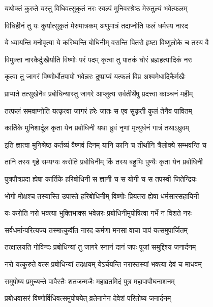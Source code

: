 \twolineshloka
{यथोक्तं कुरुते यस्तु विधिवत्सुकृतं नरः}
{स्वल्पं मुनिवरश्रेष्ठ मेरुतुल्यं भवेत्फलम्}%

\twolineshloka
{विधिहीनं तु यः कुर्यात्सुकृतं मेरुमात्रकम्}
{अणुमात्रं तदाप्नोति फलं धर्मस्य नारद}%

\twolineshloka
{ये ध्यायन्ति मनोवृत्या ये करिष्यन्ति बोधिनीम्}
{वसन्ति पितरो हृष्टा विष्णुलोके च तस्य वै}%

\twolineshloka
{विमुक्ता नारकैर्दुःखैर्याति विष्णोः परं पदम्}
{कृत्वा तु पातकं घोरं ब्रह्महत्यादिकं नरः}%

\twolineshloka
{कृत्वा तु जागरं विष्णोर्धौतपापो भवेन्नरः}
{दुष्प्राप्यं यत्फलं विप्र अश्वमेधादिकैर्मखैः}%

\twolineshloka
{प्राप्यते तत्सुखेनैव प्रबोधिन्यास्तु जागरे}
{आप्लुत्य सर्वतीर्थेषु प्रदत्त्वा काञ्चनं महीम्}%

\twolineshloka
{तत्फलं समवाप्नोति यत्कृत्वा जागरं हरेः}
{जातः स एव सुकृती कुलं तेनैव पावितम्}%

\twolineshloka
{कार्तिके मुनिशार्दूल कृता येन प्रबोधिनी}
{यथा ध्रुवं नृणां मृत्युर्धनं गात्रं तथाऽध्रुवम्}%

\twolineshloka
{इति ज्ञात्वा मुनिश्रेष्ठ कर्तव्यं वैष्णवं दिनम्}
{यानि कानि च तीर्थानि त्रैलोक्ये सम्भवन्ति च}%

\twolineshloka
{तानि तस्य गृहे सम्यग्यः करोति प्रबोधिनीम्}
{किं तस्य बहुभिः पुण्यैः कृता येन प्रबोधिनी}%

\twolineshloka
{पुत्रपौत्रप्रदा ह्येषा कार्तिके हरिबोधिनी}
{स ज्ञानी च स योगी च स तपस्वी जितेन्द्रियः}%

\twolineshloka
{भोगो मोक्षश्च तस्यास्ति उपास्ते हरिबोधिनीम्}
{विष्णोः प्रियतरा ह्येषा धर्मसारसहायिनी}%

\twolineshloka
{यः करोति नरो भक्त्या भुक्तिभाक्स भवेन्नरः}
{प्रबोधिनीमुपोषित्वा गर्भे न विशते नरः}%

\twolineshloka
{सर्वधर्मान्परित्यज्य तस्मात्कुर्वीत नारद}
{कर्मणा मनसा वाचा पापं यत्समुपार्जितम्}%

\twolineshloka
{तत्क्षालयति गोविन्दः प्रबोधिन्यां तु जागरे}
{स्नानं दानं जपः पूजां समुद्दिश्य जनार्दनम्}%

\twolineshloka
{नरो यत्कुरुते वत्स प्रबोधिन्यां तदक्षयम्}
{येऽर्चयन्ति नरास्तस्यां भक्त्या देवं च माधवम्}%

\twolineshloka
{समुपोष्य प्रमुच्यन्ते पापैस्तैः शतजन्मजैः}
{महाव्रतमिदं पुत्र महापापौघनाशनम्}%

\twolineshloka
{प्रबोधवासरं विष्णोर्विधिवत्समुपोषयेत्}
{व्रतेनानेन देवेशं परितोष्य जनार्दनम्}%

